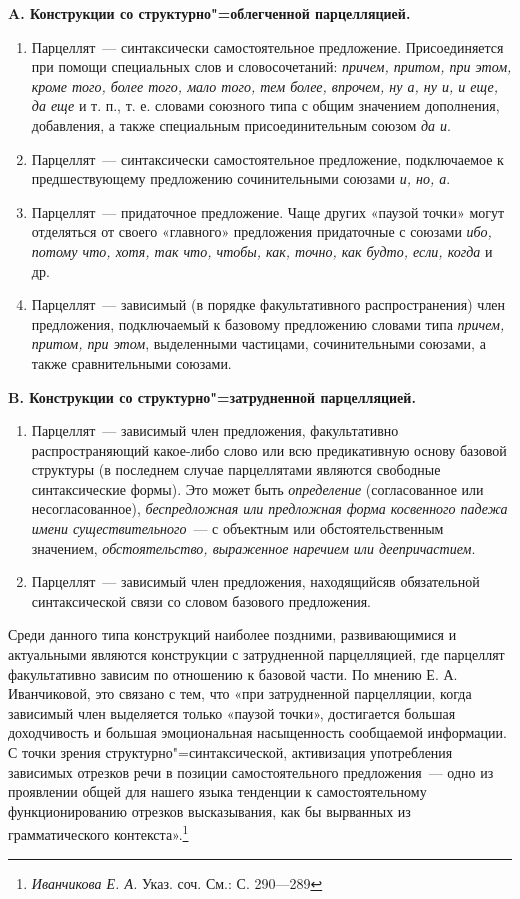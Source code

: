 \documentclass{kursa4}
\begin{document}
      {\centering
      \textbf{A. Конструкции со структурно"=облегченной парцелляцией.}}
      \begin{enumerate}
        \item Парцеллят~--- синтаксически самостоятельное предложение. Присоединяется при помощи специальных слов и словосочетаний: \textit{причем, притом, при этом, кроме того, более того, мало того, тем более, впрочем, ну а, ну и, и еще, да еще} и т. п., т. е. словами союзного типа с общим значением дополнения, добавления, а также специальным присоединительным союзом \textit{да и}. \item Парцеллят~--- синтаксически самостоятельное предложение, подключаемое к предшествующему предложению сочинительными союзами \textit{и, но, а}. \item Парцеллят~--- придаточное предложение. Чаще других «паузой точки» могут отделяться от своего «главного» предложения придаточные с союзами \textit{ибо, потому что, хотя, так что, чтобы, как, точно, как будто, если, когда}
        и др. \item Парцеллят~--- зависимый (в порядке факультативного распространения) член предложения, подключаемый к базовому предложению словами типа \textit{причем, притом, при этом}, выделенными частицами, сочинительными союзами, а также сравнительными союзами. \end{enumerate}

      {\centering\textbf{B. Конструкции со структурно"=затрудненной парцелляцией.}}
      \begin{enumerate}
        \item {Парцеллят~--- зависимый член предложения, факультативно распространяющий какое-либо слово или всю предикативную основу базовой структуры (в последнем случае парцеллятами являются свободные синтаксические формы). Это может быть
        }\textit{определение}
        (согласованное или несогласованное), \textit{беспредложная или предложная форма косвенного падежа имени существительного}~--- с объектным или обстоятельственным значением, \textit{обстоятельство, выраженное наречием или деепричастием}. \item {Парцеллят~--- зависимый член предложения, находящийся}в обязательной синтаксической связи со словом базового предложения. \end{enumerate}

      Среди данного типа конструкций наиболее поздними, развивающимися и актуальными являются конструкции с затрудненной парцелляцией, где парцеллят факультативно зависим по отношению к базовой части. По мнению Е. А. Иванчиковой, это связано с тем, что «при затрудненной парцелляции, когда зависимый член выделяется только «паузой точки», достигается большая доходчивость и большая эмоциональная насыщенность сообщаемой информации. С точки зрения структурно"=синтаксической, активизация употребления зависимых отрезков речи в позиции самостоятельного предложения~--- одно из проявлении общей для нашего языка тенденции к самостоятельному функционированию отрезков высказывания, как бы вырванных из грамматического контекста».\footnote{\textit{ Иванчикова Е. А. }{Указ. соч. См.: С. 290—289}}
\end{document}
